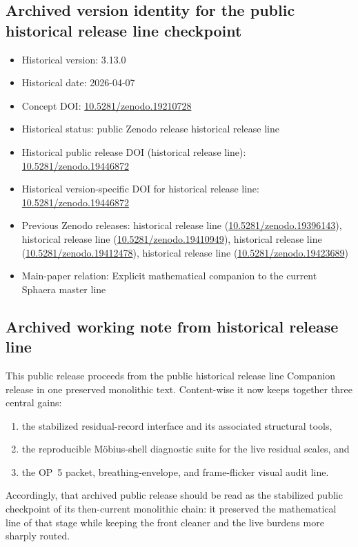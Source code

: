 \documentclass[12pt,a4paper]{article}
\DeclareRobustCommand{\QSCver}[1]{archival stage}
\renewcommand{\QSCver}[1]{historical release line}
\begin{document}
\subsection*{Archived version identity for the public \QSCver{legacy.13.0} checkpoint}
\begin{itemize}[leftmargin=2em]
 \item Historical version: 3.13.0
 \item Historical date: 2026-04-07
 \item Concept DOI: \href{https://doi.org/10.5281/zenodo.19210728}{10.5281/zenodo.19210728}
 \item Historical status: public Zenodo release \QSCver{legacy.13.0}
 \item Historical public release DOI (\QSCver{legacy.13.0}): \href{https://doi.org/10.5281/zenodo.19446872}{10.5281/zenodo.19446872}
 \item Historical version-specific DOI for \QSCver{legacy.13.0}: \href{https://doi.org/10.5281/zenodo.19446872}{10.5281/zenodo.19446872}
 \item Previous Zenodo releases: \QSCver{legacy.3.5} (\href{https://doi.org/10.5281/zenodo.19396143}{10.5281/zenodo.19396143}), \QSCver{legacy.4.0} (\href{https://doi.org/10.5281/zenodo.19410949}{10.5281/zenodo.19410949}), \QSCver{legacy.7.1} (\href{https://doi.org/10.5281/zenodo.19412478}{10.5281/zenodo.19412478}), \QSCver{legacy.9.0} (\href{https://doi.org/10.5281/zenodo.19423689}{10.5281/zenodo.19423689})
 \item Main-paper relation: Explicit mathematical companion to the current Sphaera master line~\cite{brendecke2026main}
\end{itemize}

\subsection*{Archived working note from \QSCver{legacy.13.0}}
This public release proceeds from the public \QSCver{legacy.11.0} Companion release in one preserved monolithic text. Content-wise it now keeps together three central gains:
\begin{enumerate}[leftmargin=2em,label=(\roman*)]
 \item the stabilized residual-record interface and its associated structural tools,
 \item the reproducible M\"obius-shell diagnostic suite for the live residual scales, and
 \item the OP~5 packet, breathing-envelope, and frame-flicker visual audit line.
\end{enumerate}
Accordingly, that archived public release should be read as the stabilized public checkpoint of its then-current monolithic chain: it preserved the mathematical line of that stage while keeping the front cleaner and the live burdens more sharply routed.
\end{document}
